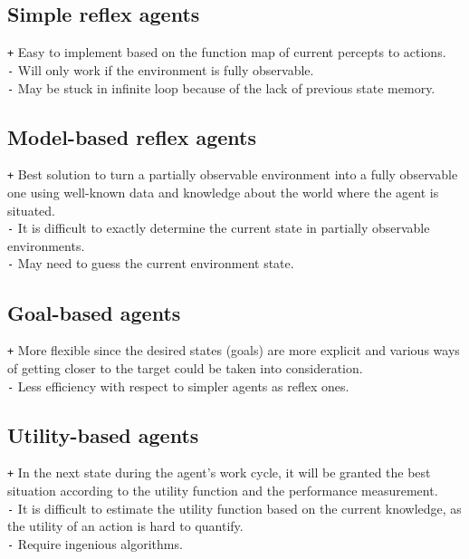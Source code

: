 \documentclass{article}
\begin{document}
\subsection{Simple reflex agents}
\texttt{+} Easy to implement based on the function map of current percepts to actions.\\
\texttt{-} Will only work if the environment is fully observable.\\
\texttt{-} May be stuck in infinite loop because of the lack of previous state memory.

\subsection{Model-based reflex agents}
\texttt{+} Best solution to turn a partially observable environment into a fully observable one using well-known data and knowledge about the world where the agent is situated.\\
\texttt{-} It is difficult to exactly determine the current state in partially observable environments.\\
\texttt{-} May need to guess the current environment state.

\subsection{Goal-based agents}
\texttt{+} More flexible since the desired states (goals) are more explicit and various ways of getting closer to the target could be taken into consideration.\\
\texttt{-} Less efficiency with respect to simpler agents as reflex ones.

\subsection{Utility-based agents}
\texttt{+} In the next state during the agent’s work cycle, it will be granted the best situation according to the utility function and the performance measurement.\\
\texttt{-} It is difficult to estimate the utility function based on the current knowledge, as the utility of an action is hard to quantify.\\
\texttt{-} Require ingenious algorithms.

\newpage
\end{document}
